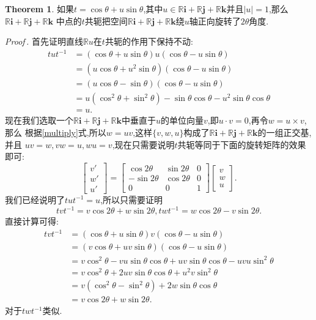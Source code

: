 \documentclass[10pt,a4paper]{ctexbook}
\theoremstyle{definition}
\newtheorem{theorem}{Theorem}[section]
\renewcommand{\proofname}{Proof}
\renewenvironment{proof}[1][]{\par\noindent\textit{\proofname\,#1.}\;\fangsong}{\hfill$\boxed{}$\par}
\begin{document}
\begin{theorem}
    如果$t=\cos\theta+u\sin\theta$,其中$u\in\mathbb{R}\mathbf{i}+\mathbb{R}\mathbf{j}+\mathbb{R}\mathbf{k}$并且$|u|=1$,那么$\mathbb{R}\mathbf{i}+\mathbb{R}\mathbf{j}+\mathbb{R}\mathbf{k}$%
    中点的$t$共轭把空间$\mathbb{R}\mathbf{i}+\mathbb{R}\mathbf{j}+\mathbb{R}\mathbf{k}$绕$u$轴正向旋转了$2\theta$角度.
\end{theorem}
\begin{proof}
    首先证明直线$\mathbb{R}u$在$t$共轭的作用下保持不动:
    \begin{align*}
        tut^{-1}&=(\cos\theta+u\sin\theta)u(\cos\theta-u\sin\theta)\\
        &=(u\cos\theta+u^2\sin\theta)(\cos\theta-u\sin\theta)\\
        &=(u\cos\theta-\sin\theta)(\cos\theta-u\sin\theta)\\
        &=u(\cos^2\theta+\sin^2\theta)-\sin\theta\cos\theta-u^2\sin\theta\cos\theta\\
        &=u.
    \end{align*}
    现在我们选取一个$\mathbb{R}\mathbf{i}+\mathbb{R}\mathbf{j}+\mathbb{R}\mathbf{k}$中垂直于$u$的单位向量$v$,即$u\cdot v=0$,再令$w=u\times v$,那么%
    根据\eqref{multiply}式,所以$w=uv$,这样$\{v,w,u\}$构成了$\mathbb{R}\mathbf{i}+\mathbb{R}\mathbf{j}+\mathbb{R}\mathbf{k}$的一组正交基,并且%
    $uv=w,vw=u,wu=v$,现在只需要说明$t$共轭等同于下面的旋转矩阵的效果即可:
    \[
        \begin{bmatrix}
            v' \\ w' \\ u'
        \end{bmatrix}=\begin{bmatrix}
            \cos 2\theta & \sin 2\theta & 0 \\
            -\sin 2\theta & \cos 2\theta & 0 \\
            0 & 0 & 1
        \end{bmatrix}\begin{bmatrix}
            v \\ w \\ u
        \end{bmatrix}.
    \]
    我们已经说明了$tut^{-1}=u$,所以只需要证明
    \[
        tvt^{-1}=v\cos 2\theta+w\sin 2\theta,twt^{-1}=w\cos 2\theta-v \sin 2\theta.
    \]
    直接计算可得:
    \begin{align*}
        tvt^{-1}&=(\cos\theta+u\sin\theta)v(\cos\theta -u\sin\theta)\\
        &=(v\cos\theta+uv\sin\theta)(\cos\theta-u\sin\theta) \\
        &=v\cos^2\theta-vu\sin\theta\cos\theta+uv\sin\theta\cos\theta-uvu\sin^2\theta\\
        &=v\cos^2\theta+2uv\sin\theta\cos\theta+u^2v\sin^2\theta \\
        &=v(\cos^2\theta-\sin^2\theta)+2w\sin\theta\cos\theta \\
        &=v\cos 2\theta+w\sin 2\theta.
    \end{align*}
    对于$twt^{-1}$类似.
\end{proof}
\end{document}
